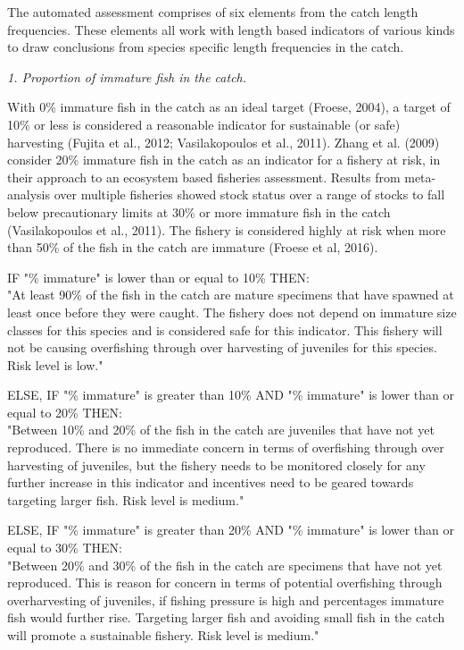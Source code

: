 The automated assessment comprises of six elements from the catch length frequencies. These elements all work with length based indicators of various kinds to draw conclusions from species specific length frequencies in the catch.

\textit{1. Proportion of immature fish in the catch.}

With 0\% immature fish in the catch as an ideal target (Froese, 2004), a target of 10\% or less is considered a reasonable indicator for sustainable (or safe) harvesting (Fujita et al., 2012; Vasilakopoulos et al., 2011). Zhang et al. (2009) consider 20\% immature fish in the catch as an indicator for a fishery at risk, in their approach to an ecosystem based fisheries assessment. Results from meta-analysis over multiple fisheries showed stock status over a range of stocks to fall below precautionary limits at 30\% or more immature fish in the catch (Vasilakopoulos et al., 2011). The fishery is considered highly at risk when more than 50\% of the fish in the catch are immature (Froese et al, 2016).

\clearpage
\newpage

IF "\% immature" is lower than or equal to 10\% THEN:\\[0cm]
"At least 90\% of the fish in the catch are mature specimens that have spawned at least once before they were caught. The fishery does not depend on immature size classes for this species and is considered safe for this indicator. This fishery will not be causing overfishing through over harvesting of juveniles for this species. Risk level is low."

ELSE, IF "\% immature" is greater than 10\% AND "\% immature" is lower than or equal to 20\% THEN:\\[0cm]
"Between 10\% and 20\% of the fish in the catch are juveniles that have not yet reproduced. There is no immediate concern in terms of overfishing through over harvesting of juveniles, but the fishery needs to be monitored closely for any further increase in this indicator and incentives need to be geared towards targeting larger fish. Risk level is medium."

ELSE, IF "\% immature" is greater than 20\% AND "\% immature" is lower than or equal to 30\% THEN:\\[0cm]
"Between 20\% and 30\% of the fish in the catch are specimens that have not yet reproduced. This is reason for concern in terms of potential overfishing through overharvesting of juveniles, if fishing pressure is high and percentages immature fish would further rise. Targeting larger fish and avoiding small fish in the catch will promote a sustainable fishery. Risk level is medium."

